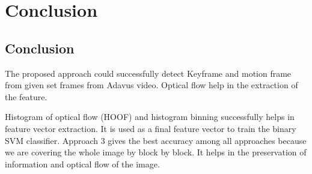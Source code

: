 \chapter{Conclusion} %

\label{Chapter 7} 

\section{Conclusion}
The proposed approach could successfully detect Keyframe and motion frame from given set frames from Adavus video. Optical flow help in the extraction of the feature.

Histogram of optical flow (HOOF) and histogram binning successfully helps in feature vector extraction. It is used as a final feature vector to train the binary SVM classifier.
Approach $3$ gives the best accuracy among all approaches because we are covering the whole image by block by block. It helps in the preservation of information and optical flow of the image.
